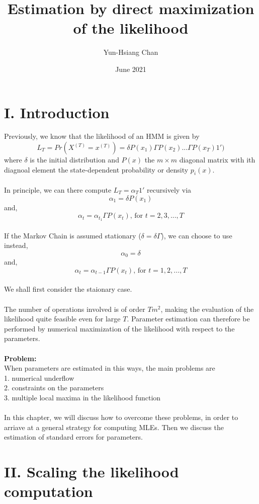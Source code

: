 \documentclass{article}
\title{Estimation by direct maximization of the likelihood}
\author{Yun-Hsiang Chan}
\date{June 2021}
\begin{document}
\maketitle

\section*{I. Introduction}
Previously, we know that the likelihood of an HMM is given by 
$$L_T = Pr(X^{(T)} = x^{(T)}) = \delta P(x_1) \Gamma P(x_2) ... \Gamma P(x_T)1')$$
where $\delta$ is the initial distribution and $P(x)$ the $m \times m$ diagonal matrix with ith diagnoal element the state-dependent probability or density $p_i(x)$. \\
\\
In principle, we can there compute $L_T = \alpha_T 1'$ recursively via
$$\alpha_1 = \delta P(x_1)$$
and,
$$\alpha_t = \alpha_{t_1} \Gamma P(x_t) \text{, for } t = 2, 3, ..., T$$
\\
If the Markov Chain is assumed stationary ($\delta = \delta \Gamma$), we can choose to use instead, 
$$\alpha_0 = \delta$$
and,
$$\alpha_t = \alpha_{t-1}\Gamma P(x_t) \text{, for } t = 1, 2, ..., T$$
\\
We shall first consider the staionary case. \\
\\
The number of operations involved is of order $Tm^2$, making the evaluation of the likelihood quite feasible even for large $T$. Parameter estimation can therefore be performed by numerical maximization of the likelihood with respect to the parameters. \\
\\
\textbf{Problem:}\\
When parameters are estimated in this ways, the main problems are\\
1. numerical underflow \\
2. constraints on the parameters \\
3. multiple local maxima in the likelihood function \\
\\
In this chapter, we will discuss how to overcome these problems, in order to arriave at a general strategy for computing MLEs. Then we discuss the estimation of standard errors for parameters.

\section*{II. Scaling the likelihood computation}
\end{document}
